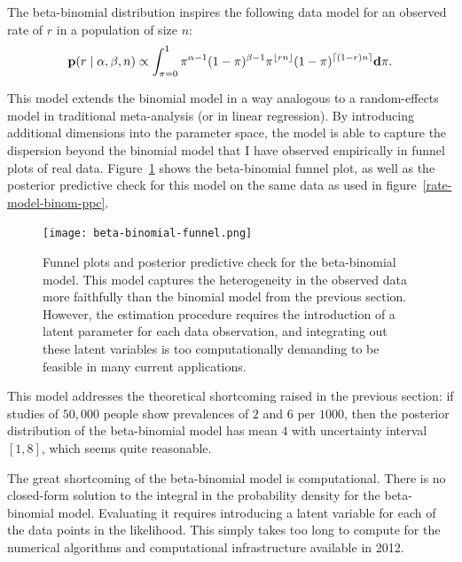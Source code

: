 The beta-binomial distribution inspires the following data model for
an observed rate of $r$ in a population of size $n$:
\[
\mathbf{p}(r\;|\; \alpha, \beta, n) \propto
\int_{\pi=0}^1 \pi^{\alpha-1}(1-\pi)^{\beta-1}
\pi^{\lfloor rn\rfloor} (1-\pi)^{\lceil (1-r)n\rceil} \mathbf{d}\pi.
\]

This model extends the binomial model in a way analogous to a random-effects
model in traditional meta-analysis\cite{borenstein_introduction_2011} (or in linear regression\cite{Rabe-Hesketh_Multilevel_2008}).  By introducing additional
dimensions into the parameter space, the model is able to capture the
dispersion beyond the binomial model that I have observed empirically
in funnel plots of real data.
Figure~\ref{rate-model-beta-binomial-funnel} shows the beta-binomial funnel
plot, as well as the posterior predictive check for
this model on the same data as used in
figure~\ref{rate-model-binom-ppc}.

\begin{figure}[ht]
\begin{center}
\texttt{[image: beta-binomial-funnel.png]}
\end{center}
\caption[Funnel plots and posterior predictive check for the beta-binomial
  model.]{Funnel plots and posterior predictive check for the beta-binomial
  model. This model captures the heterogeneity in the observed data
  more faithfully than the binomial model from the previous section.
  However, the estimation procedure requires the introduction of a latent
  parameter for each data observation, and integrating out these
  latent variables is too computationally demanding to be feasible in
  many current applications.}
\label{rate-model-beta-binomial-funnel}
\end{figure}

This model addresses the theoretical shortcoming raised in the
previous section: if studies of $50,000$ people show prevalences of
$2$ and $6$ per $1000$, then the posterior distribution of the
beta-binomial model has mean $4$ with uncertainty interval $[1,8]$,
which seems quite reasonable.

The great shortcoming of the beta-binomial model is computational.
There is no closed-form solution to the integral in the probability
density for the beta-binomial model.  Evaluating it requires
introducing a latent variable for each of the data points in the
likelihood.  This simply takes too long to compute for the numerical
algorithms and computational infrastructure available in 2012.

